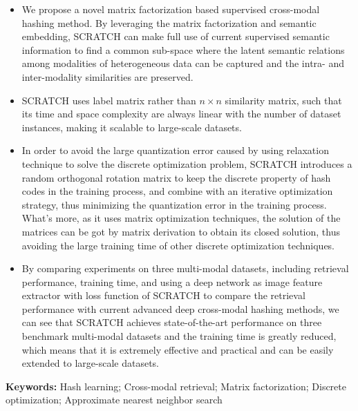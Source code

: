\begin{englishabstract}
\begin{itemize}
\vspace{-3mm}
\item We propose a novel matrix factorization based supervised cross-modal hashing method. By leveraging the matrix factorization and semantic embedding, SCRATCH can make full use of current supervised semantic information to find a common sub-space where the latent semantic relations among modalities of heterogeneous data can be captured and the intra- and inter-modality similarities are preserved.
\vspace{-3mm}
\item SCRATCH uses label matrix rather than $n \times n$ similarity matrix, such that its time and space complexity are always linear with the number of dataset instances, making it scalable to large-scale datasets.
\vspace{-3mm}
\item In order to avoid the large quantization error caused by using relaxation technique to solve the discrete optimization problem, SCRATCH introduces a random orthogonal rotation matrix to keep the discrete property of hash codes in the training process, and combine with an iterative optimization strategy, thus minimizing the quantization error in the training process. What's more, as it uses matrix optimization techniques, the solution of the matrices can be got by matrix derivation to obtain its closed solution, thus avoiding the large training time of other discrete optimization techniques.
\vspace{-3mm}
\item By comparing experiments on three multi-modal datasets, including retrieval performance, training time, and using a deep network as image feature extractor with loss function of SCRATCH to compare the retrieval performance with current advanced deep cross-modal hashing methods, we can see that SCRATCH achieves state-of-the-art performance on three benchmark multi-modal datasets and the training time is greatly reduced, which means that it is extremely effective and practical and can be easily extended to large-scale datasets.
\end{itemize}


\noindent\textbf{Keywords:} Hash learning; Cross-modal retrieval; Matrix factorization; Discrete\\
optimization; Approximate nearest neighbor search

\end{englishabstract}
